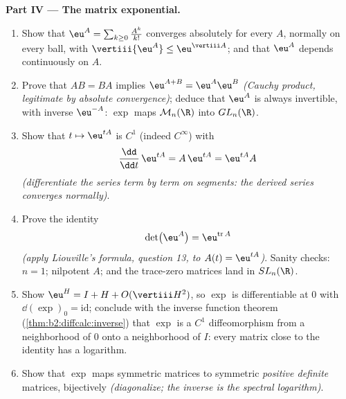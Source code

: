\begin{problem}
\medskip
\noindent\textbf{Part IV --- The matrix exponential.}
\begin{enumerate}[resume]
  \item Show that $\eu^A = \sum_{k\geq0}\frac{A^k}{k!}$
        converges absolutely for every $A$, normally on every
        ball, with $\vertiii{\eu^A} \leq
        \eu^{\vertiii A}$; and that $\eu^A$ depends
        continuously on $A$.
  \item Prove that $AB = BA$ implies $\eu^{A+B} =
        \eu^A\eu^B$ \emph{(Cauchy product, legitimate by
        absolute convergence)}; deduce that $\eu^A$ is always
        invertible, with inverse $\eu^{-A}$: $\exp$ maps
        $\mathcal M_n(\R)$ into $GL_n(\R)$.
  \item Show that $t \mapsto \eu^{tA}$ is $C^1$ (indeed
        $C^\infty$) with
        \[
        \frac{\dd}{\dd t}\,\eu^{tA} = A\,\eu^{tA} =
        \eu^{tA}A
        \]
        \emph{(differentiate the series term by term on
        segments: the derived series converges normally)}.
  \item Prove the identity
        \[
        \det\bigl(\eu^{A}\bigr) = \eu^{\operatorname{tr}A}
        \]
        \emph{(apply Liouville's formula, question 13, to
        $A(t) = \eu^{tA}$)}. Sanity checks: $n = 1$; nilpotent
        $A$; and the trace-zero matrices land in
        $SL_n(\R)$.
  \item Show $\eu^H = I + H + O(\vertiii H^2)$, so $\exp$ is
        differentiable at $0$ with $\dd(\exp)_0 =
        \mathrm{id}$; conclude with the inverse function
        theorem (\cref{thm:b2:diffcalc:inverse}) that $\exp$
        is a $C^1$ diffeomorphism from a neighborhood of $0$
        onto a neighborhood of $I$: every matrix close to the
        identity has a logarithm.
  \item Show that $\exp$ maps symmetric matrices to symmetric
        \emph{positive definite} matrices, bijectively
        \emph{(diagonalize; the inverse is the spectral
        logarithm)}.
\end{enumerate}


\end{problem}

